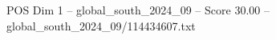\begin{textsample}{POS Dim 1 – global\_south\_2024\_09 – Score 30.00 – global\_south\_2024\_09/114434607.txt}
\end{textsample}
